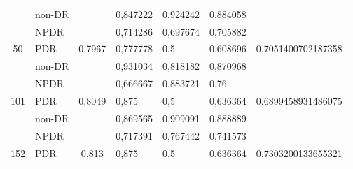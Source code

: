\begin{table}[hbtp]
\begin{center}
\begin{tabular}{|c|l|c|l|l|l|c|}
			& non-DR                                             &                          & 0,847222                                          & 0,924242                                         & 0,884058                                        &                                      \\ \cline{2-2} \cline{4-6}
			& NPDR                                               &                          & 0,714286                                          & 0,697674                                         & 0,705882                                        &                                      \\ \cline{2-2} \cline{4-6}
			\multirow{-3}{*}{50}  & PDR                                                & \multirow{-3}{*}{0,7967} & 0,777778                                          & 0,5                                              & 0,608696                                        & \multirow{-3}{*}{0.7051400702187358} \\ \hline
			& non-DR                                             &                          & 0,931034                                          & 0,818182                                         & 0,870968                                        &                                      \\ \cline{2-2} \cline{4-6}
			& NPDR                                               &                          & 0,666667                                          & 0,883721                                         & 0,76                                            &                                      \\ \cline{2-2} \cline{4-6}
			\multirow{-3}{*}{101} & PDR                                                & \multirow{-3}{*}{0,8049} & 0,875                                             & 0,5                                              & 0,636364                                        & \multirow{-3}{*}{0.6899458931486075} \\ \hline
			& non-DR                                             &                          & 0,869565                                          & 0,909091                                         & 0,888889                                        &                                      \\ \cline{2-2} \cline{4-6}
			& NPDR                                               &                          & 0,717391                                          & 0,767442                                         & 0,741573                                        &                                      \\ \cline{2-2} \cline{4-6}
			\multirow{-3}{*}{152} & PDR                                                & \multirow{-3}{*}{0,813}  & 0,875                                             & 0,5                                              & 0,636364                                        & \multirow{-3}{*}{0.7303200133655321} \\ \hline
		\end{tabular}
	\end{center}
\end{table}

